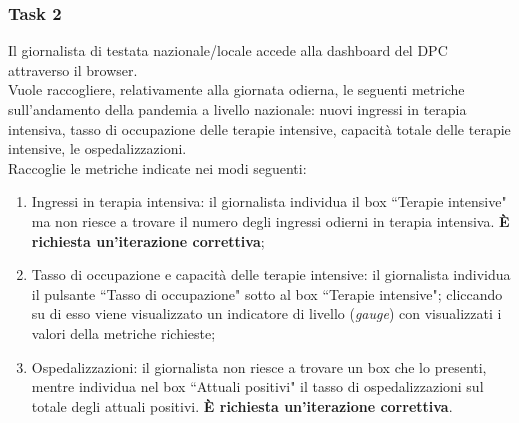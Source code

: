 \subsubsection{Task 2}
\label{sss:cw-task-2}

Il giornalista di testata nazionale/locale accede alla dashboard del DPC attraverso il browser.\\
Vuole raccogliere, relativamente alla giornata odierna, le seguenti metriche sull'andamento della pandemia a livello nazionale: nuovi ingressi in terapia intensiva, tasso di occupazione delle terapie intensive, capacità totale delle terapie intensive, le ospedalizzazioni.\\
Raccoglie le metriche indicate nei modi seguenti:
\begin{enumerate}
    \item Ingressi in terapia intensiva: il giornalista individua il box ``Terapie intensive" ma non riesce a trovare il numero degli ingressi odierni in terapia intensiva. \textbf{È richiesta un'iterazione correttiva};\label{cw2:a}
    \item Tasso di occupazione e capacità delle terapie intensive: il giornalista individua il pulsante ``Tasso di occupazione" sotto al box ``Terapie intensive"; cliccando su di esso viene visualizzato un indicatore di livello (\textit{gauge}) con visualizzati i valori della metriche richieste; \label{cw2:b}
    \item Ospedalizzazioni: il giornalista non riesce a trovare un box che lo presenti, mentre individua nel box ``Attuali positivi" il tasso di ospedalizzazioni sul totale degli attuali positivi. \textbf{È richiesta un'iterazione correttiva}. \label{cw2:c}
\end{enumerate}

